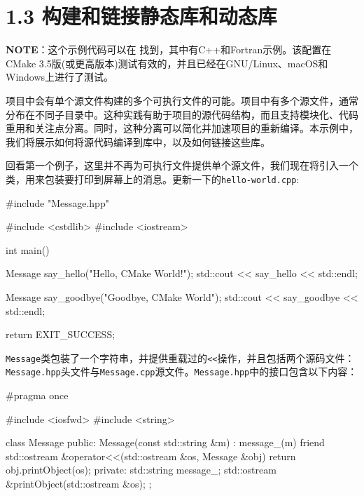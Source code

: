 \section{1.3 构建和链接静态库和动态库}

\begin{myInfoBox}
\textbf{NOTE}：这个示例代码可以在  找到，其中有C++和Fortran示例。该配置在CMake 3.5版(或更高版本)测试有效的，并且已经在GNU/Linux、macOS和Windows上进行了测试。
\end{myInfoBox}

项目中会有单个源文件构建的多个可执行文件的可能。项目中有多个源文件，通常分布在不同子目录中。这种实践有助于项目的源代码结构，而且支持模块化、代码重用和关注点分离。同时，这种分离可以简化并加速项目的重新编译。本示例中，我们将展示如何将源代码编译到库中，以及如何链接这些库。


回看第一个例子，这里并不再为可执行文件提供单个源文件，我们现在将引入一个类，用来包装要打印到屏幕上的消息。更新一下的\texttt{hello-world.cpp}:

\begin{codebox}[cpp]
#include "Message.hpp"

#include <cstdlib>
#include <iostream>

int main() {
  Message say_hello("Hello, CMake World!");
  std::cout << say_hello << std::endl;
  
  Message say_goodbye("Goodbye, CMake World");
  std::cout << say_goodbye << std::endl;
  
  return EXIT_SUCCESS;
}
\end{codebox}

\texttt{Message}类包装了一个字符串，并提供重载过的\texttt{<<}操作，并且包括两个源码文件：\texttt{Message.hpp}头文件与\texttt{Message.cpp}源文件。\texttt{Message.hpp}中的接口包含以下内容：

\begin{codebox}[cpp]
#pragma once

#include <iosfwd>
#include <string>

class Message {
public:
  Message(const std::string &m) : message_(m) {}
  friend std::ostream &operator<<(std::ostream &os, Message &obj) {
    return obj.printObject(os);
  }
private:
  std::string message_;
  std::ostream &printObject(std::ostream &os);
};
\end{codebox}

